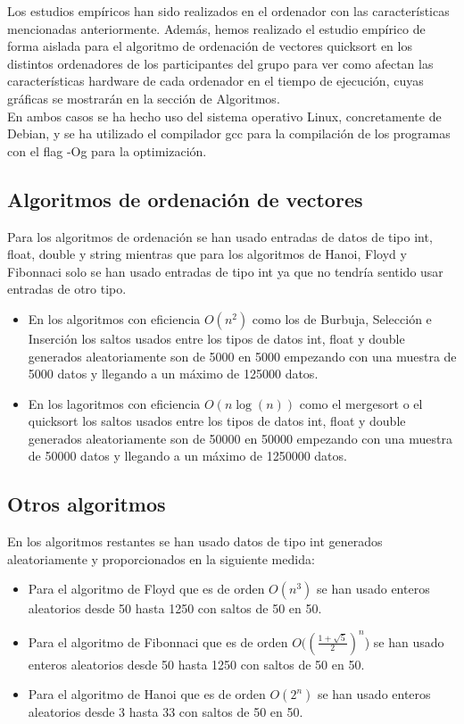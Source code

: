 \documentclass[11pt]{article}
\begin{document}
    Los estudios empíricos han sido realizados en el ordenador con las características mencionadas anteriormente.
    Además, hemos realizado el estudio empírico de forma aislada para el algoritmo de ordenación de vectores
    quicksort en los distintos ordenadores de los participantes del grupo para ver como afectan las características
    hardware de cada ordenador en el tiempo de ejecución, cuyas gráficas se mostrarán en la sección de Algoritmos. \\
    En ambos casos se ha hecho uso del sistema operativo Linux, concretamente de Debian, y se ha utilizado el
    compilador gcc para la compilación de los programas  con el flag -Og para la optimización.
    \subsection{Algoritmos de ordenación de vectores}
    Para los algoritmos de ordenación se han usado entradas de datos de tipo int, float, double y string mientras que para los algoritmos de Hanoi, Floyd  y Fibonnaci solo se han usado entradas de tipo int 
    ya que no tendría sentido usar entradas de otro tipo. 
    \begin{itemize}
        \item En los algoritmos con eficiencia  \(O(n^2)\) como los de Burbuja, Selección e Inserción los saltos usados entre los tipos de datos int, float y double generados aleatoriamente son de 5000 en 5000 empezando con una muestra de 5000 datos y llegando a
        un máximo de 125000 datos.
        \item En los lagoritmos con eficiencia \(O (n\log(n))\) como el mergesort o el quicksort los saltos usados entre los tipos de datos int, float y double generados aleatoriamente son de 50000 en 50000 empezando con una muestra de 50000 datos y llegando a
        un máximo de 1250000 datos.
    \end{itemize}

    \subsection{Otros algoritmos}
    En los algoritmos restantes se han usado datos de tipo int generados aleatoriamente y proporcionados en la siguiente medida:
    \begin{itemize}
        \item Para el algoritmo de Floyd  que es de orden \(O(n^3)\) se han usado enteros aleatorios desde 50 hasta 1250 con saltos de 50 en 50.
        \item Para el algoritmo de Fibonnaci  que es de orden \(O((\frac{1+\sqrt{5}}{2})^n\)) se han usado enteros aleatorios desde 50 hasta 1250 con saltos de 50 en 50.
        \item Para el algoritmo de Hanoi que es de orden \(O(2^n)\) se han usado enteros aleatorios desde 3 hasta 33 con saltos de 50 en 50. 
    \end{itemize}
\end{document}
